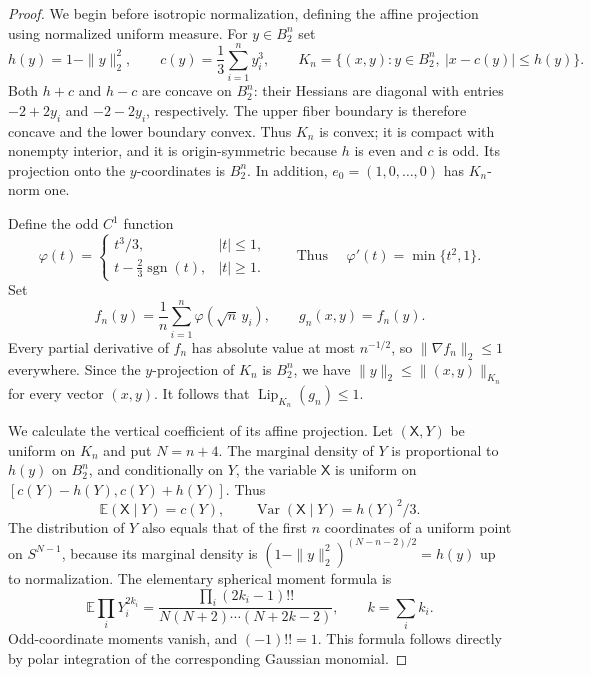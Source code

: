 \documentclass[11pt,a4paper]{article}
\theoremstyle{remark}
\begin{document}
\begin{proof}
We begin before isotropic normalization, defining the affine projection
using normalized uniform measure.  For $y\in B_2^n$ set
\[
 h(y)=1-\|y\|_2^2,\qquad c(y)=\frac13\sum_{i=1}^n y_i^3,
 \qquad
 K_n=\{(x,y):y\in B_2^n,\ |x-c(y)|\leq h(y)\}.
\]
Both $h+c$ and $h-c$ are concave on $B_2^n$: their Hessians are
diagonal with entries $-2+2y_i$ and $-2-2y_i$, respectively.
The upper fiber boundary is therefore concave and the lower boundary
convex.  Thus $K_n$ is convex; it is compact with nonempty interior,
and it is origin-symmetric because $h$ is even and $c$ is odd.
Its projection onto the $y$-coordinates is $B_2^n$.  In addition,
$e_0=(1,0,\ldots,0)$ has $K_n$-norm one.

Define the odd $C^1$ function
\[
 \varphi(t)=
 \begin{cases}
 t^3/3,&|t|\leq1,\\
 t-\tfrac23\operatorname{sgn}(t),&|t|\geq1.
 \end{cases}
 \qquad\text{Thus }\quad\varphi'(t)=\min\{t^2,1\}.
\]
Set
\[
 f_n(y)=\frac1n\sum_{i=1}^n\varphi(\sqrt n\,y_i),
 \qquad g_n(x,y)=f_n(y).
\]
Every partial derivative of $f_n$ has absolute value at most
$n^{-1/2}$, so $\|\nabla f_n\|_2\leq1$ everywhere.
Since the $y$-projection of $K_n$ is $B_2^n$, we have
$\|y\|_2\leq\|(x,y)\|_{K_n}$ for every vector $(x,y)$.
It follows that $\operatorname{Lip}_{K_n}(g_n)\leq1$.

We calculate the vertical coefficient of its affine projection.
Let $(\mathsf X,Y)$ be uniform on $K_n$ and put $N=n+4$.
The marginal density of $Y$ is proportional to $h(y)$ on $B_2^n$,
and conditionally on $Y$, the variable $\mathsf X$ is uniform on
$[c(Y)-h(Y),c(Y)+h(Y)]$.  Thus
\begin{equation}\label{eq:898-conditional}
 \mathbb E(\mathsf X\mid Y)=c(Y),\qquad
 \operatorname{Var}(\mathsf X\mid Y)=h(Y)^2/3.
\end{equation}
The distribution of $Y$ also equals that of the first $n$ coordinates
of a uniform point on $S^{N-1}$, because its marginal density is
$(1-\|y\|_2^2)^{(N-n-2)/2}=h(y)$ up to normalization.
The elementary spherical moment formula is
\begin{equation}\label{eq:898-moments}
 \mathbb E\prod_iY_i^{2k_i}
 =\frac{\prod_i(2k_i-1)!!}
 {N(N+2)\cdots(N+2k-2)},\qquad k=\sum_i k_i.
\end{equation}
Odd-coordinate moments vanish, and $(-1)!!=1$.
This formula follows directly by polar integration of the corresponding
Gaussian monomial.


\end{proof}
\end{document}
